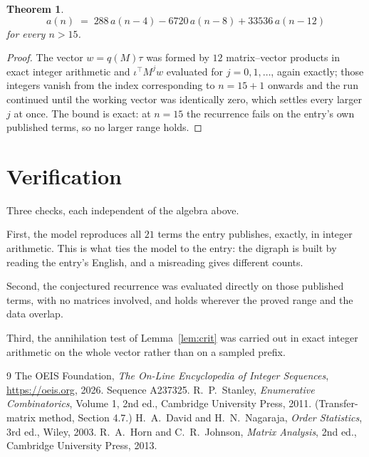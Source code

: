 \documentclass[11pt,a4paper]{article}
\theoremstyle{plain}
\newtheorem{theorem}{Theorem}
\theoremstyle{definition}
\begin{document}
\begin{theorem}
\[
a(n)\;=\;288\,a(n-4) - 6720\,a(n-8) + 33536\,a(n-12)
\]
for every $n>15$.
\end{theorem}

\begin{proof}
The vector $w=q(M)\tau$ was formed by $12$ matrix--vector products in exact integer
arithmetic and $\iota^{\!\top}M^{j}w$ evaluated for $j=0,1,\dots$, again exactly; those
integers vanish from the index corresponding to $n=15+1$ onwards and the run continued
until the working vector was identically zero, which settles every larger $j$ at once. The bound is exact: at $n=15$ the recurrence fails on the entry's own published terms, so no larger range holds.
\end{proof}

\section{Verification}

Three checks, each independent of the algebra above.

First, the model reproduces all $21$ terms the entry publishes, exactly, in integer
arithmetic. This is what ties the model to the entry: the digraph is built by reading the
entry's English, and a misreading gives different counts.

Second, the conjectured recurrence was evaluated directly on those published terms, with no
matrices involved, and holds wherever the proved range and the data overlap.

Third, the annihilation test of Lemma~\ref{lem:crit} was carried out in exact integer
arithmetic on the whole vector rather than on a sampled prefix.

\begin{thebibliography}{9}
 The OEIS Foundation, \emph{The On-Line Encyclopedia of Integer
Sequences}, \url{https://oeis.org}, 2026. Sequence A237325.
 R.~P.~Stanley, \emph{Enumerative Combinatorics}, Volume 1, 2nd ed.,
Cambridge University Press, 2011. (Transfer-matrix method, Section 4.7.)
 H.~A.~David and H.~N.~Nagaraja, \emph{Order Statistics}, 3rd ed., Wiley,
2003.
 R.~A.~Horn and C.~R.~Johnson, \emph{Matrix Analysis}, 2nd ed., Cambridge
University Press, 2013.
\end{thebibliography}
\end{document}
